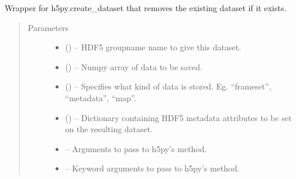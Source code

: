 \documentclass[letterpaper,10pt,english]{sphinxmanual}
\begin{document}
\begin{fulllineitems}
\begin{fulllineitems}
\end{fulllineitems}


\begin{fulllineitems}
\label{\detokenize{xanespy:xanespy.txmstore.TXMStore.replace_dataset}}
Wrapper for h5py.create\_dataset that removes the existing dataset
if it exists.
\begin{quote}\begin{description}
\item[{Parameters}] \leavevmode\begin{itemize}
\item {} 
 () -- HDF5 groupname name to give this dataset.

\item {} 
 () -- Numpy array of data to be saved.

\item {} 
 (\sphinxstyleliteralemphasis{, }) -- Specifies what kind of data is stored. Eg. ``frameset'',
``metadata'', ``map''.

\item {} 
 (\sphinxstyleliteralemphasis{, }) -- Dictionary containing HDF5 metadata attributes to be set on
the resulting dataset.

\item {} 
 -- Arguments to pass to h5py's  method.

\item {} 
 -- Keyword arguments to pass to h5py's  method.

\end{itemize}

\end{description}\end{quote}

\end{fulllineitems}


\end{fulllineitems}
\end{document}
